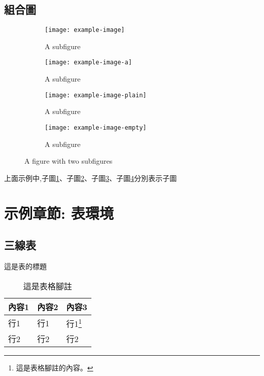 \documentclass[
    writingLanguage=chinese, %
    addPageTitle=on,  %
    addDeclaration=on, %
    addMUSTlogo=on, %
    addFigTOC=on, %
    addTabTOC=on, %
    refIndent=off, %
    printMod=off, %
]{.def/must}
\begin{document}
\section{組合圖}
\begin{figure}[H]
	\centering
	\begin{subfigure}{0.49\textwidth}
	  	\centering
            \texttt{[image: example-image]}
		\caption{A subfigure}
		\label{fig:sub1}
	\end{subfigure}
	\hfill
	\begin{subfigure}{.49\textwidth}
		\centering
            \texttt{[image: example-image-a]}
		\caption{A subfigure}
	  	\label{fig:sub2}
	\end{subfigure}
        \newline
	\begin{subfigure}{.49\textwidth}
		\centering
            \texttt{[image: example-image-plain]}
		\caption{A subfigure}
		\label{fig:sub3}
	\end{subfigure}
	\begin{subfigure}{.49\textwidth}
		\centering
            \texttt{[image: example-image-empty]}
		\caption{A subfigure}
		\label{fig:sub4}
	\end{subfigure}
	\caption{A figure with two subfigures}
	\label{fig:sub}
\end{figure}
上面示例中,子圖\ref{fig:sub1}、子圖\ref{fig:sub2}、子圖\ref{fig:sub3}、子圖\ref{fig:sub4}分別表示子圖



















\chapter{示例章節: 表環境}
\section{三線表}
\begin{table}[H]
\caption{這是表的標題}
\centering
\begin{tabularx}{\textwidth}{XXX} %
\toprule
內容1 & 內容2 & 內容3 \\
\midrule
行1 & 行1 & 行1\footnote{這是表格腳註的內容。} \\
行2 & 行2 & 行2 \\
\bottomrule
\end{tabularx}
\caption*{這是表格腳註}
\end{table}
\end{document}
